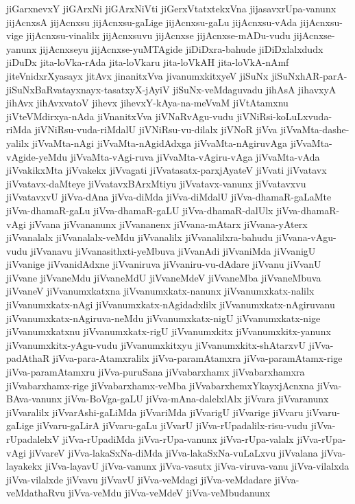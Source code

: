 {jiGarxnevxY
jiGArxNi
jiGArxNiVti
jiGerxVtatxtekxVna
jijasavxrUpa-vanunx
jijAcnxsA
jijAcnxsu
jijAcnxsu-gaLige
jijAcnxsu-gaLu
jijAcnxsu-vAda
jijAcnxsu-vige
jijAcnxsu-vinalilx
jijAcnxsuvu
jijAcnxse
jijAcnxse-mADu-vudu
jijAcnxse-yanunx
jijAcnxseyu
jijAcnxse-yuMTAgide
jiDiDxra-bahude
jiDiDxlalxdudx
jiDuDx
jita-loVka-rAda
jita-loVkaru
jita-loVkAH
jita-loVkA-nAmf
jiteVnidxrXyasayx
jitAvx
jinanitxVva
jivanumxkitxyeV
jiSuNx
jiSuNxhAR-parA-jiSuNxBaRvatayxnayx-tasatxyX-jAyiV
jiSuNx-veMdaguvadu
jihAsA
jihavxyA
jihAvx
jihAvxvatoV
jihevx
jihevxY-kAya-na-meVvaM
jiVtAtamxnu
jiVteVMdirxya-nAda
jiVnanitxVva
jiVNaRvAgu-vudu
jiVNiRsi-koLuLxvuda-riMda
jiVNiRsu-vuda-riMdalU
jiVNiRsu-vu-dilalx
jiVNoR
jiVva
jiVvaMta-dashe-yalilx
jiVvaMta-nAgi
jiVvaMta-nAgidAdxga
jiVvaMta-nAgiruvAga
jiVvaMta-vAgide-yeMdu
jiVvaMta-vAgi-ruva
jiVvaMta-vAgiru-vAga
jiVvaMta-vAda
jiVvakikxMta
jiVvakekx
jiVvagati
jiVvatasatx-parxjAyateV
jiVvati
jiVvatavx
jiVvatavx-daMteye
jiVvatavxBArxMtiyu
jiVvatavx-vanunx
jiVvatavxvu
jiVvatavxvU
jiVva-dAna
jiVva-diMda
jiVva-diMdalU
jiVva-dhamaR-gaLaMte
jiVva-dhamaR-gaLu
jiVva-dhamaR-gaLU
jiVva-dhamaR-dalUlx
jiVva-dhamaR-vAgi
jiVvana
jiVvananunx
jiVvananenx
jiVvana-mAtarx
jiVvana-yAterx
jiVvanalalx
jiVvanalalx-veMdu
jiVvanalilx
jiVvanalilxra-bahudu
jiVvana-vAgu-vudu
jiVvanavu
jiVvanasithxti-yeMbuva
jiVvanAdi
jiVvaniMda
jiVvanigU
jiVvanige
jiVvanidAdxne
jiVvaniruva
jiVvaniru-vu-dAdare
jiVvanu
jiVvanU
jiVvane
jiVvaneMdu
jiVvaneMdU
jiVvaneMdeV
jiVvaneMba
jiVvaneMbuva
jiVvaneV
jiVvanumxkatxna
jiVvanumxkatx-nanunx
jiVvanumxkatx-nalilx
jiVvanumxkatx-nAgi
jiVvanumxkatx-nAgidadxlilx
jiVvanumxkatx-nAgiruvanu
jiVvanumxkatx-nAgiruva-neMdu
jiVvanumxkatx-nigU
jiVvanumxkatx-nige
jiVvanumxkatxnu
jiVvanumxkatx-rigU
jiVvanumxkitx
jiVvanumxkitx-yanunx
jiVvanumxkitx-yAgu-vudu
jiVvanumxkitxyu
jiVvanumxkitx-shAtarxvU
jiVva-padAthaR
jiVva-para-Atamxralilx
jiVva-paramAtamxra
jiVva-paramAtamx-rige
jiVva-paramAtamxru
jiVva-puruSana
jiVvabarxhamx
jiVvabarxhamxra
jiVvabarxhamx-rige
jiVvabarxhamx-veMba
jiVvabarxhemxYkayxjAcnxna
jiVva-BAva-vanunx
jiVva-BoVga-gaLU
jiVva-mAna-dalelxlAlx
jiVvara
jiVvaranunx
jiVvaralilx
jiVvarAshi-gaLiMda
jiVvariMda
jiVvarigU
jiVvarige
jiVvaru
jiVvaru-gaLige
jiVvaru-gaLirA
jiVvaru-gaLu
jiVvarU
jiVva-rUpadalilx-risu-vudu
jiVva-rUpadalelxV
jiVva-rUpadiMda
jiVva-rUpa-vanunx
jiVva-rUpa-valalx
jiVva-rUpa-vAgi
jiVvareV
jiVva-lakaSxNa-diMda
jiVva-lakaSxNa-vuLaLxvu
jiVvalana
jiVva-layakekx
jiVva-layavU
jiVva-vanunx
jiVva-vasutx
jiVva-viruva-vanu
jiVva-vilalxda
jiVva-vilalxde
jiVvavu
jiVvavU
jiVva-veMdagi
jiVva-veMdadare
jiVva-veMdathaRvu
jiVva-veMdu
jiVva-veMdeV
jiVva-veMbudanunx
}
